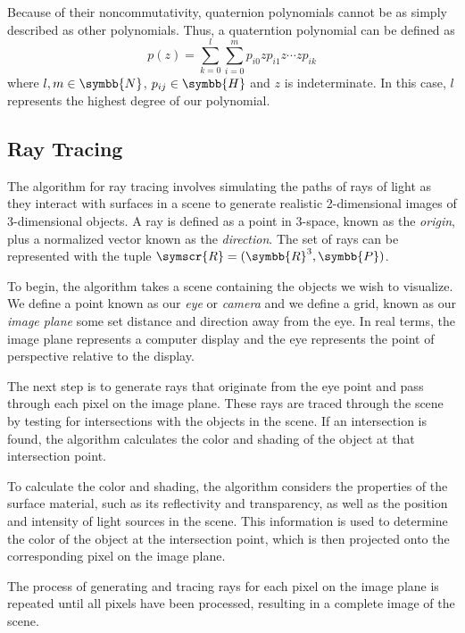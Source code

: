\documentclass[11pt,hidelinks]{article}
\numberwithin{equation}{section} %
\theoremstyle{bf}
\theoremstyle{indentbf}
\begin{document}
Because of their noncommutativity, quaternion polynomials cannot be as simply described as other polynomials. Thus, a quaterntion polynomial can be defined as
\begin{equation}
    p(z) = \sum^l_{k=0} \sum^m_{i=0} p_{i0}zp_{i1}z \cdots zp_{ik}
\end{equation}
where \(l,m \in \symbb{N}\), \(p_{ij} \in \symbb{H}\) and \(z\) is indeterminate. In this case, \(l\) represents the highest degree of our polynomial.

\subsection{Ray Tracing}
\label{sec:org9b4a9ea}

The algorithm for ray tracing involves simulating the paths of rays of light as they interact with surfaces in a scene to generate realistic 2-dimensional images of 3-dimensional objects. A ray is defined as a point in 3-space, known as the \emph{origin}, plus a normalized vector known as the \emph{direction}. The set of rays can be represented with the tuple \(\symscr{R} = (\symbb{R}^3, \symbb{P})\).

To begin, the algorithm takes a scene containing the objects we wish to visualize. We define a point known as our \emph{eye} or \emph{camera} and we define a grid, known as our \emph{image plane} some set distance and direction away from the eye. In real terms, the image plane represents a computer display and the eye represents the point of perspective relative to the display.

The next step is to generate rays that originate from the eye point and pass through each pixel on the image plane. These rays are traced through the scene by testing for intersections with the objects in the scene. If an intersection is found, the algorithm calculates the color and shading of the object at that intersection point.

To calculate the color and shading, the algorithm considers the properties of the surface material, such as its reflectivity and transparency, as well as the position and intensity of light sources in the scene. This information is used to determine the color of the object at the intersection point, which is then projected onto the corresponding pixel on the image plane.

The process of generating and tracing rays for each pixel on the image plane is repeated until all pixels have been processed, resulting in a complete image of the scene.
\end{document}
